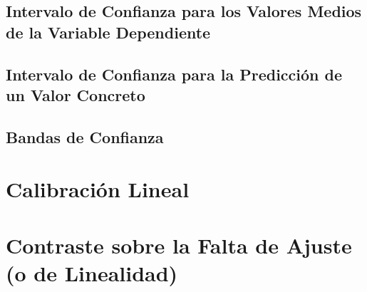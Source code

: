 \documentclass[10pt,a4paper]{book}
\begin{document}
		\subsection{Intervalo de Confianza para los Valores Medios de la Variable Dependiente}
		\subsection{Intervalo de Confianza para la Predicción de un Valor Concreto}
		\subsection{Bandas de Confianza}
	\section{Calibración Lineal}
	\section{Contraste sobre la Falta de Ajuste (o de Linealidad)}
\end{document}

